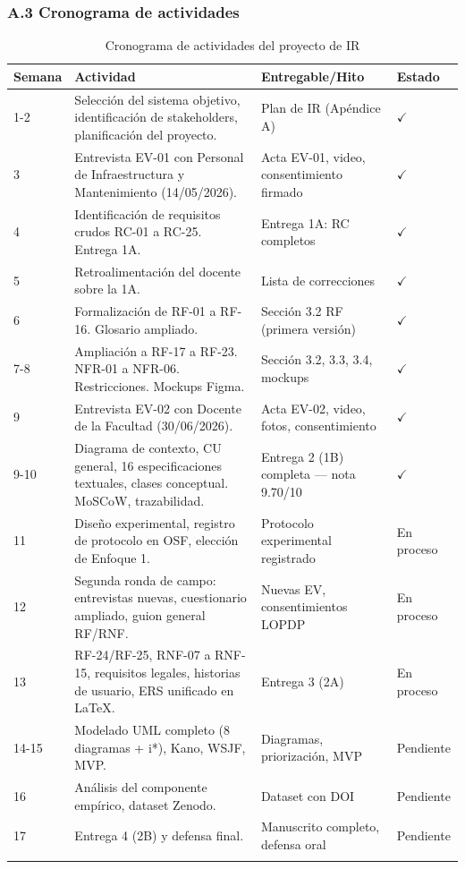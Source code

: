 \subsubsection*{A.3 Cronograma de actividades}


\begingroup
\small
\begin{longtable}{|p{3.9cm}|p{3.9cm}|p{3.9cm}|p{3.9cm}|}
\hline
Semana & Actividad & Entregable/Hito & Estado \\ \hline
1-2 & Selección del sistema objetivo, identificación de stakeholders, planificación del proyecto. & Plan de IR (Apéndice A) & $\checkmark$ \\ \hline
3 & Entrevista EV-01 con Personal de Infraestructura y Mantenimiento (14/05/2026). & Acta EV-01, video, consentimiento firmado & $\checkmark$ \\ \hline
4 & Identificación de requisitos crudos RC-01 a RC-25. Entrega 1A. & Entrega 1A: RC completos & $\checkmark$ \\ \hline
5 & Retroalimentación del docente sobre la 1A. & Lista de correcciones & $\checkmark$ \\ \hline
6 & Formalización de RF-01 a RF-16. Glosario ampliado. & Sección 3.2 RF (primera versión) & $\checkmark$ \\ \hline
7-8 & Ampliación a RF-17 a RF-23. NFR-01 a NFR-06. Restricciones. Mockups Figma. & Sección 3.2, 3.3, 3.4, mockups & $\checkmark$ \\ \hline
9 & Entrevista EV-02 con Docente de la Facultad (30/06/2026). & Acta EV-02, video, fotos, consentimiento & $\checkmark$ \\ \hline
9-10 & Diagrama de contexto, CU general, 16 especificaciones textuales, clases conceptual. MoSCoW, trazabilidad. & Entrega 2 (1B) completa --- nota 9.70/10 & $\checkmark$ \\ \hline
11 & Diseño experimental, registro de protocolo en OSF, elección de Enfoque 1. & Protocolo experimental registrado & En proceso \\ \hline
12 & Segunda ronda de campo: entrevistas nuevas, cuestionario ampliado, guion general RF/RNF. & Nuevas EV, consentimientos LOPDP & En proceso \\ \hline
13 & RF-24/RF-25, RNF-07 a RNF-15, requisitos legales, historias de usuario, ERS unificado en LaTeX. & Entrega 3 (2A) & En proceso \\ \hline
14-15 & Modelado UML completo (8 diagramas + i*), Kano, WSJF, MVP. & Diagramas, priorización, MVP & Pendiente \\ \hline
16 & Análisis del componente empírico, dataset Zenodo. & Dataset con DOI & Pendiente \\ \hline
17 & Entrega 4 (2B) y defensa final. & Manuscrito completo, defensa oral & Pendiente \\ \hline
\caption{Cronograma de actividades del proyecto de IR}
\end{longtable}
\endgroup

